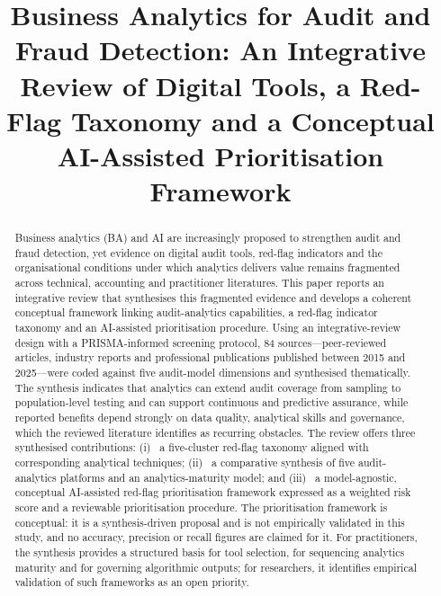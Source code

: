 \documentclass[conference]{IEEEtran}
\begin{document}
\title{Business Analytics for Audit and Fraud Detection: An Integrative Review of Digital Tools, a Red-Flag Taxonomy and a Conceptual AI-Assisted Prioritisation Framework\\


}

\author{
}

\maketitle

\begin{abstract}
Business analytics (BA) and AI are increasingly proposed to strengthen audit and fraud detection, yet evidence on digital audit tools, red-flag indicators and the organisational conditions under which analytics delivers value remains fragmented across technical, accounting and practitioner literatures. This paper reports an integrative review that synthesises this fragmented evidence and develops a coherent conceptual framework linking audit-analytics capabilities, a red-flag indicator taxonomy and an AI-assisted prioritisation procedure. Using an integrative-review design with a PRISMA-informed screening protocol, 84 sources---peer-reviewed articles, industry reports and professional publications published between 2015 and 2025---were coded against five audit-model dimensions and synthesised thematically. The synthesis indicates that analytics can extend audit coverage from sampling to population-level testing and can support continuous and predictive assurance, while reported benefits depend strongly on data quality, analytical skills and governance, which the reviewed literature identifies as recurring obstacles. The review offers three synthesised contributions: (i) ~a five-cluster red-flag taxonomy aligned with corresponding analytical techniques; (ii) ~a comparative synthesis of five audit-analytics platforms and an analytics-maturity model; and (iii) ~a model-agnostic, conceptual AI-assisted red-flag prioritisation framework expressed as a weighted risk score and a reviewable prioritisation procedure. The prioritisation framework is conceptual: it is a synthesis-driven proposal and is not empirically validated in this study, and no accuracy, precision or recall figures are claimed for it. For practitioners, the synthesis provides a structured basis for tool selection, for sequencing analytics maturity and for governing algorithmic outputs; for researchers, it identifies empirical validation of such frameworks as an open priority.
\end{abstract}
\end{document}
